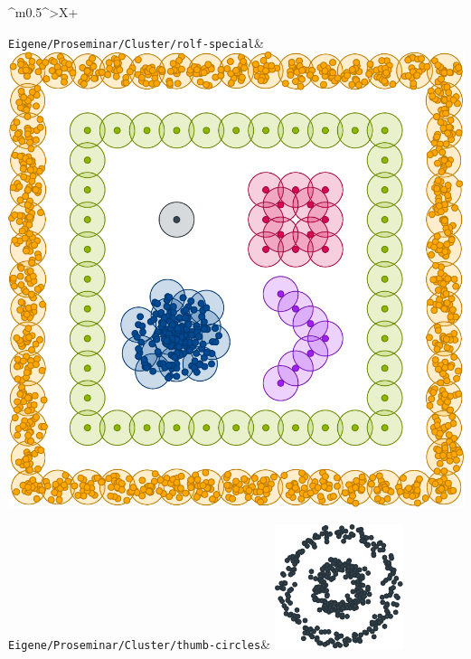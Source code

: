 \documentclass[PLAIN]{Lilly}
\begin{document}
\begin{tabularx}{\linewidth}{^m{0.5\linewidth}^>{\centering\arraybackslash}X+}
\midrule {} {}\verb|Eigene/Proseminar/Cluster/rolf-special|& \includegraphics[width=0.8\linewidth]{Eigene/Proseminar/Cluster/rolf-special.pdf}\\
\midrule {} {}\verb|Eigene/Proseminar/Cluster/thumb-circles|& \includegraphics[width=0.8\linewidth]{Eigene/Proseminar/Cluster/thumb-circles.pdf}\\

\end{tabularx}
\end{document}
